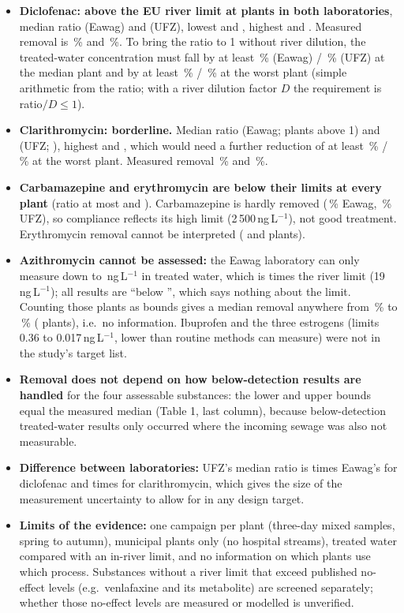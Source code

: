 \documentclass[10pt,a4paper]{article}
\newcommand{\ngL}{ng\,L$^{-1}$}
\newcommand{\sect}[1]{\vspace{2pt}{\large\bfseries #1}\par\vspace{-1pt}}
\begin{document}
\sect{3\quad Conclusions}
\begin{itemize}
  \item \textbf{Diclofenac: above the EU river limit at \dicAbovee{} plants in both laboratories}, median ratio \dicMedRe{} (Eawag) and \dicMedRu{} (UFZ), lowest \dicMinRe{} and \dicMinRu{}, highest \dicMaxRe{} and \dicMaxRu{}. Measured removal is \dicReme\,\% and \dicRemu\,\%. To bring the ratio to 1 without river dilution, the treated-water concentration must fall by at least \dicRedMede\,\% (Eawag) / \dicRedMedu\,\% (UFZ) at the median plant and by at least \dicRedMaxe\,\% / \dicRedMaxu\,\% at the worst plant (simple arithmetic from the ratio; with a river dilution factor $D$ the requirement is ratio$/D\le 1$).
  \item \textbf{Clarithromycin: borderline.} Median ratio \claMedRe{} (Eawag; \claAbovee{} plants above 1) and \claMedRu{} (UFZ; \claAboveu{}), highest \claMaxRe{} and \claMaxRu{}, which would need a further reduction of at least \claRedMaxe\,\% / \claRedMaxu\,\% at the worst plant. Measured removal \claReme\,\% and \claRemu\,\%.
  \item \textbf{Carbamazepine and erythromycin are below their limits at every plant} (ratio at most \carMaxR{} and \eryMaxR{}). Carbamazepine is hardly removed (\carReme\,\% Eawag, \carRemu\,\% UFZ), so compliance reflects its high limit (2\,500\,\ngL{}), not good treatment. Erythromycin removal cannot be interpreted (\eryNreme{} and \eryNremu{} plants).
  \item \textbf{Azithromycin cannot be assessed:} the Eawag laboratory can only measure down to \aziLOQ\,\ngL{} in treated water, which is \aziLOQratio{} times the river limit (19\,\ngL{}); all \Nplants{} results are ``below \aziLOQ{}'', which says nothing about the limit. Counting those plants as bounds gives a median removal anywhere from \aziBndLo\,\% to \aziBndHi\,\% (\aziBndN{} plants), i.e.\ no information. Ibuprofen and the three estrogens (limits 0.36 to 0.017\,\ngL{}, lower than routine methods can measure) were not in the study's target list.
  \item \textbf{Removal does not depend on how below-detection results are handled} for the four assessable substances: the lower and upper bounds equal the measured median (Table 1, last column), because below-detection treated-water results only occurred where the incoming sewage was also not measurable.
  \item \textbf{Difference between laboratories:} UFZ's median ratio is \dicLabRatio{} times Eawag's for diclofenac and \claLabRatio{} times for clarithromycin, which gives the size of the measurement uncertainty to allow for in any design target.
  \item \textbf{Limits of the evidence:} one campaign per plant (three-day mixed samples, spring to autumn), municipal plants only (no hospital streams), treated water compared with an in-river limit, and no information on which plants use which process. Substances without a river limit that exceed published no-effect levels (e.g.\ venlafaxine and its metabolite) are screened separately; whether those no-effect levels are measured or modelled is unverified.
\end{itemize}
\end{document}
